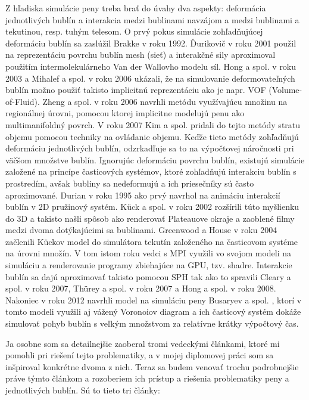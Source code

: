 Z hľadiska simulácie peny treba brať do úvahy dva aspekty: deformácia jednotlivých bublín a interakcia medzi bublinami navzájom a medzi bublinami a tekutinou, resp. tuhým telesom. O prvý pokus simulácie zohľadňujúcej deformáciu bublín sa zaslúžil Brakke \cite{brakke1992} v roku 1992. Ďurikovič \cite{durikovic2001} v roku 2001 použil na reprezentáciu povrchu bublín mesh (sieť) a interakčné sily aproximoval použitím intermolekulárneho Van der Wallovho modelu síl. Hong a spol. \cite{hong2003} v roku 2003 a Mihalef a spol. \cite{mihalef2006} v roku 2006 ukázali, že na simulovanie deformovateľných bublín možno použiť takisto implicitnú reprezentáciu ako je napr. VOF (Volume-of-Fluid). Zheng a spol. \cite{zheng2006} v roku 2006 navrhli metódu využívajúcu množinu na regionálnej úrovni, pomocou ktorej implicitne modelujú penu ako multimanifoldný povrch. V roku 2007 Kim a spol. \cite{kim2007} pridali do tejto metódy stratu objemu pomocou techniky na ovládanie objemu. Keďže tieto metódy zohľadňujú deformáciu jednotlivých bublín, odzrkadľuje sa to na výpočtovej náročnosti pri väčšom množstve bublín. Ignorujúc deformáciu povrchu bublín, existujú simulácie založené na princípe časticových systémov, ktoré zohľadňujú interakciu bublín s prostredím, avšak bubliny sa nedeformujú a ich priesečníky sú často aproximované. Durian \cite{durian1995} v roku 1995 ako prvý navrhol na animáciu interakcií bublín v 2D pružinový systém. Kück a spol. \cite{kueck2002} v roku 2002 rozšírili túto myšlienku do 3D a takisto našli spôsob ako renderovať Plateauove okraje a zaoblené filmy medzi dvoma dotýkajúcimi sa bublinami. Greenwood a House \cite{greenwood2004} v roku 2004 začlenili Kückov model do simulátora tekutín založeného na časticovom systéme na úrovni množín. V tom istom roku vedci s MPI \cite{sunkel2004} využili vo svojom modeli na simuláciu a renderovanie programy zbiehajúce na GPU, tzv. shadre. Interakcie bublín sa dajú aproximovať takisto pomocou SPH tak ako to spravili Cleary a spol. \cite{cleary2007} v roku 2007, Thürey a spol. \cite{thurey2007} v roku 2007 a Hong a spol. \cite{hong2008} v roku 2008. Nakoniec v roku 2012 navrhli model na simuláciu peny Busaryev a spol. \cite{busaryev2012}, ktorí v tomto modeli využili aj vážený Voronoiov diagram a ich časticový systém dokáže simulovať pohyb bublín s veľkým množstvom za relatívne krátky výpočtový čas.

Ja osobne som sa detailnejšie zaoberal tromi vedeckými článkami, ktoré mi pomohli pri riešení tejto problematiky, a v mojej diplomovej práci som sa inšpiroval konkrétne dvoma z nich. Teraz sa budem venovať trochu podrobnejšie práve týmto článkom a rozoberiem ich prístup a riešenia problematiky peny a jednotlivých bublín. Sú to tieto tri články:

